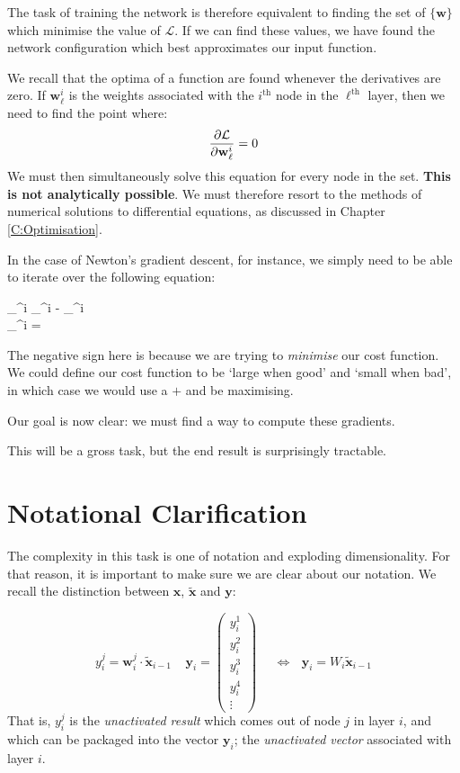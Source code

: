 \documentclass[a4paper,openany,11pt]{book}
\newcommand\cec[1]{\tilde{\vec{#1}}}
\renewcommand\vec[1]{\boldsymbol{\mathbf{#1}}}
\begin{document}
				The task of training the network is therefore equivalent to finding the set of $\{\vec{w}\}$ which minimise the value of $\mathcal{L}$. If we can find these values, we have found the network configuration which best approximates our input function. 

				We recall that the optima of a function are found whenever the derivatives are zero. If $\vec{w}_\ell^i$ is the weights associated with the $i^\text{th}$ node in the $\ell^\text{th}$ layer, then we need to find the point where:
				\begin{equation}
					\pdiv{\mathcal{L}}{\vec{w}_\ell^i} = 0
				\end{equation}
				We must then simultaneously solve this equation for every node in the set. \textbf{This is not analytically possible}. We must therefore resort to the methods of numerical solutions to differential equations, as discussed in Chapter \ref{C:Optimisation}.

				In the case of Newton's gradient descent, for instance, we simply need to be able to iterate over the following equation:
				\begin{spalign}
					\vec{w}_\ell^i \to \vec{w}_\ell^i - \frac{\alpha}{|\vec{d}_\ell^i|}\vec{d}_\ell^i
					\\
					\vec{d}_\ell^i = \pdiv{\mathcal{L}}{\vec{w}_\ell^i}
				\end{spalign}
				The negative sign here is because we are trying to \textit{minimise} our cost function. We could define our cost function to be `large when good' and `small when bad', in which case we would use a $+$ and be maximising. 

				Our goal is now clear: we must find a way to compute these gradients.
				
				This will be a gross task, but the end result is surprisingly tractable.


			\section{Notational Clarification}

				The complexity in this task is one of notation and exploding dimensionality. For that reason, it is important to make sure we are clear about our notation. We recall the distinction between $\vec{x}$, $\cec{x}$ and $\vec{y}$:


				\begin{equation}
					{y}_i^j = \vec{w}_i^j \cdot \tilde{\vec{x}}_{i-1} ~~~~~ \vec{y}_i = \begin{pmatrix}
						y_i^1 \\ y_i^2 \\ y_i^3 \\ y_i^4 \\ \vdots 
					\end{pmatrix}~~~~~~\Longleftrightarrow~~~\vec{y}_i = W_i \cec{x}_{i-1}
				\end{equation}
				That is, ${y}_i^j$ is the \textit{unactivated result} which comes out of node $j$ in layer $i$, and which can be packaged into the vector $\vec{y}_i$; the \textit{unactivated vector} associated with layer $i$.
\end{document}
